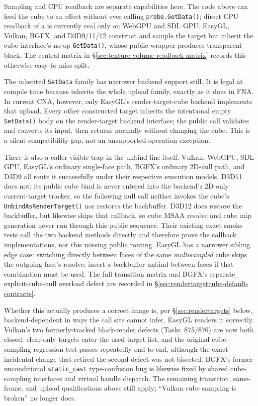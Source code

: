 Sampling and CPU readback are separate capabilities here. The code above can feed the cube to
an effect without ever calling \texttt{probe.GetData()}; direct CPU readback of a
 is currently real only on WebGPU and SDL GPU. EasyGL, Vulkan,
BGFX, and D3D9/11/12 construct and sample the target but inherit the cube interface's no-op
\texttt{GetData()}, whose public wrapper produces transparent black. The central matrix in
\S\ref{sec:texture-volume-readback-matrix} records this otherwise easy-to-miss split.

The inherited \texttt{SetData} family has narrower backend support still. It is legal at
compile time because  inherits the whole
 upload family, exactly as it does in FNA. In current CNA, however, only
EasyGL's render-target-cube backend implements that upload. Every other constructed target
inherits the intentional empty \texttt{SetData()} body on the render-target backend interface;
the public call validates and converts its input, then returns normally without changing the
cube. This is a silent compatibility gap, not an unsupported-operation exception.

There is also a caller-visible trap in the unbind line itself. Vulkan, WebGPU, SDL GPU,
EasyGL's ordinary single-face path, BGFX's ordinary 2D-null path, and D3D9 all route it
successfully under their respective execution models. D3D11 does not: its public cube bind is
never entered into the backend's 2D-only current-target tracker, so the following null call
neither invokes the cube's \texttt{UnbindAsRenderTarget()} nor restores the backbuffer.
D3D12 does restore the backbuffer, but likewise skips that callback, so cube MSAA resolve and
cube mip generation never run through this public sequence. Their existing exact smoke tests
call the two backend methods directly and therefore prove the callback implementations, not
this missing public routing. EasyGL has a narrower sibling edge case: switching directly
between faces of the same \emph{multisampled} cube skips the outgoing face's resolve; insert a
backbuffer unbind between faces if that combination must be used. The full transition matrix
and BGFX's separate explicit-cube-null overload defect are recorded in
\S\ref{sec:rendertargetcube-default-contracts}.

Whether this actually produces a correct image is, per \S\ref{sec:rendertargets} below,
backend-dependent in ways the call site cannot infer. EasyGL renders it correctly. Vulkan's
two formerly-tracked black-render defects (Tasks~875/876) are now both closed: clear-only
targets enter the used-target list, and the original cube-sampling regression test passes
repeatedly end to end, although the exact incidental change that retired the second defect was
not bisected. BGFX's former unconditional \texttt{static\_cast} type-confusion bug is likewise
fixed by shared cube-sampling interfaces and virtual handle dispatch. The remaining transition,
same-frame, and upload qualifications above still apply; ``Vulkan cube sampling is broken'' no
longer does.


